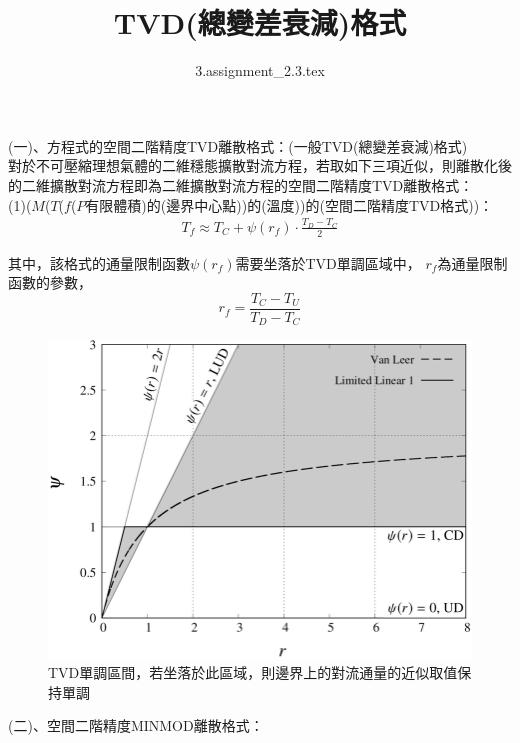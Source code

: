 \documentclass[12pt]{article}
\title{TVD(總變差衰減)格式}
\author{3.assignment\_2.3.tex}
\begin{document}
 
\maketitle 
\noindent (一)、方程式的空間二階精度TVD離散格式：(一般TVD(總變差衰減)格式)\\

對於不可壓縮理想氣體的二維穩態擴散對流方程，若取如下三項近似，則離散化後的二維擴散對流方程即為二維擴散對流方程的空間二階精度TVD離散格式：\\

\noindent (1)($M$($T$($f$($P$有限體積)的(邊界中心點))的(溫度))的(空間二階精度TVD格式))：
\begin{equation}
    \begin{split}
        T_{f} \approx T_{C} + \psi(r_{f})
        \cdot \frac{T_{D}-T_{C}}{2}
    \end{split}
\end{equation}

\noindent 其中，該格式的通量限制函數$\psi(r_{f})$需要坐落於TVD單調區域中，
$r_{f}$為通量限制函數的參數，$$r_{f} = \frac{T_{C}-T_{U}}{T_{D}-T_{C}}$$

\begin{figure}[H]
  \centering
  \includegraphics[scale = 0.3]{6.png}
  \caption{TVD單調區間，若坐落於此區域，則邊界上的對流通量的近似取值保持單調}
  \label{fig:TVD scheme }
\end{figure}


\noindent (二)、空間二階精度MINMOD離散格式：\\
\end{document}
